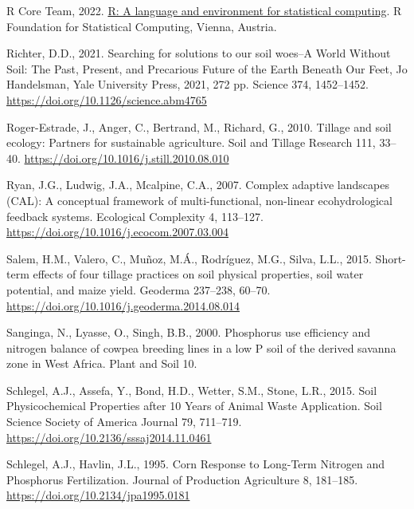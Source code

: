 \documentclass[
  12pt,
]{article}
\newlength{\cslhangindent}
\newlength{\cslentryspacingunit} %
\newenvironment{CSLReferences}[2] %
 {%
  \setlength{\parindent}{0pt}
  \ifodd #1
  \let\oldpar\par
  \def\par{\hangindent=\cslhangindent\oldpar}
  \fi
  \setlength{\parskip}{#2\cslentryspacingunit}
 }%
 {}
\begin{document}
\begin{CSLReferences}{1}{0}
\leavevmode{}%
R Core Team, 2022. \href{https://www.R-project.org/}{R: A language and environment for statistical computing}. R Foundation for Statistical Computing, Vienna, Austria.

\leavevmode{}%
Richter, D.D., 2021. Searching for solutions to our soil woes--{A World Without Soil}: {The Past}, {Present}, and {Precarious Future} of the {Earth Beneath Our Feet}, {Jo Handelsman}, {Yale University Press}, 2021, 272 pp. Science 374, 1452--1452. \url{https://doi.org/10.1126/science.abm4765}

\leavevmode{}%
Roger-Estrade, J., Anger, C., Bertrand, M., Richard, G., 2010. Tillage and soil ecology: {Partners} for sustainable agriculture. Soil and Tillage Research 111, 33--40. \url{https://doi.org/10.1016/j.still.2010.08.010}

\leavevmode{}%
Ryan, J.G., Ludwig, J.A., Mcalpine, C.A., 2007. Complex adaptive landscapes ({CAL}): {A} conceptual framework of multi-functional, non-linear ecohydrological feedback systems. Ecological Complexity 4, 113--127. \url{https://doi.org/10.1016/j.ecocom.2007.03.004}

\leavevmode{}%
Salem, H.M., Valero, C., Muñoz, M.Á., Rodríguez, M.G., Silva, L.L., 2015. Short-term effects of four tillage practices on soil physical properties, soil water potential, and maize yield. Geoderma 237--238, 60--70. \url{https://doi.org/10.1016/j.geoderma.2014.08.014}

\leavevmode{}%
Sanginga, N., Lyasse, O., Singh, B.B., 2000. Phosphorus use efficiency and nitrogen balance of cowpea breeding lines in a low {P} soil of the derived savanna zone in {West Africa}. Plant and Soil 10.

\leavevmode{}%
Schlegel, A.J., Assefa, Y., Bond, H.D., Wetter, S.M., Stone, L.R., 2015. Soil {Physicochemical Properties} after 10 {Years} of {Animal Waste Application}. Soil Science Society of America Journal 79, 711--719. \url{https://doi.org/10.2136/sssaj2014.11.0461}

\leavevmode{}%
Schlegel, A.J., Havlin, J.L., 1995. Corn {Response} to {Long-Term Nitrogen} and {Phosphorus Fertilization}. Journal of Production Agriculture 8, 181--185. \url{https://doi.org/10.2134/jpa1995.0181}


\end{CSLReferences}
\end{document}
